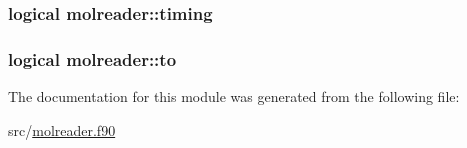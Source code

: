 \hypertarget{classmolreader_a29899cd9778ac12af6bad404c1092518}{
\subsubsection[{timing}]{\setlength{\rightskip}{0pt plus 5cm}logical molreader\+::timing\hspace{0.3cm}{\ttfamily [private]}}}\label{classmolreader_a29899cd9778ac12af6bad404c1092518}
\hypertarget{classmolreader_aec460f295b88cb8eb8dd58901edce0ba}{
\subsubsection[{to}]{\setlength{\rightskip}{0pt plus 5cm}logical molreader\+::to\hspace{0.3cm}{\ttfamily [private]}}}\label{classmolreader_aec460f295b88cb8eb8dd58901edce0ba}


The documentation for this module was generated from the following file\+:\begin{DoxyCompactItemize}
\item 
src/\hyperlink{molreader_8f90}{molreader.\+f90}\end{DoxyCompactItemize}
